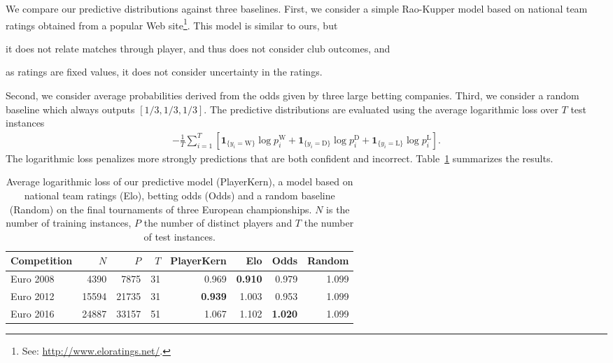 We compare our predictive distributions against three baselines.
First, we consider a simple Rao-Kupper model based on national team ratings obtained from a popular Web site\footnote{See: \url{http://www.eloratings.net/}.}.
This model is similar to ours, but
\begin{enuminline}
\item it does not relate matches through player, and thus does not consider club outcomes, and
\item as ratings are fixed values, it does not consider uncertainty in the ratings.
\end{enuminline}
Second, we consider average probabilities derived from the odds given by three large betting companies.
Third, we consider a random baseline which always outputs $[1/3, 1/3, 1/3]$.
The predictive distributions are evaluated using the average logarithmic loss over $T$ test instances
\begin{align*}
- \frac{1}{T} \sum_{i=1}^{T} \left[
\mathbf{1}_{\{y_i = \text{W}\}} \log p^{\text{W}}_i
+ \mathbf{1}_{\{y_i = \text{D}\}} \log p^{\text{D}}_i
+ \mathbf{1}_{\{y_i = \text{L}\}} \log p^{\text{L}}_i
\right].
\end{align*}
The logarithmic loss penalizes more strongly predictions that are both confident and incorrect.
Table~\ref{tab:eval} summarizes the results.


\begin{table}[t]
  \caption{
  Average logarithmic loss of our predictive model (PlayerKern), a model based on national team ratings (Elo), betting odds (Odds) and a random baseline (Random) on the final tournaments of three European championships.
  $N$ is the number of training instances, $P$ the number of distinct players and $T$ the number of test instances.}
  \label{tab:eval}
  \centering
  \setlength\tabcolsep{0.2cm}
  \begin{tabular}{l rr rrrrr}
    \toprule
    Competition & $N$         & $P$         & $T$      & PlayerKern           & Elo                  & Odds                 &  Random \\
    \midrule
    Euro 2008   & \num{4390}  & \num{7875}  & \num{31} & \num{0.969}          & \textbf{\num{0.910}} & \num{0.979}          & \num{1.099} \\
    Euro 2012   & \num{15594} & \num{21735} & \num{31} & \textbf{\num{0.939}} & \num{1.003}          & \num{0.953}          & \num{1.099} \\
    Euro 2016   & \num{24887} & \num{33157} & \num{51} & \num{1.067}          & \num{1.102}          & \textbf{\num{1.020}} & \num{1.099} \\
    \bottomrule
  \end{tabular}
\end{table}

